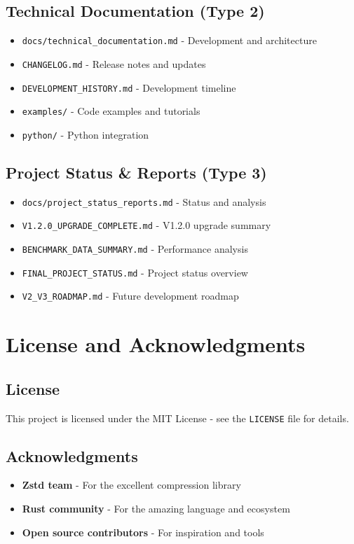 \documentclass[11pt,a4paper]{article}
\begin{document}
	\subsection{Technical Documentation (Type 2)}
	\begin{itemize}
		\item \texttt{docs/technical\_documentation.md} - Development and architecture
		\item \texttt{CHANGELOG.md} - Release notes and updates
		\item \texttt{DEVELOPMENT\_HISTORY.md} - Development timeline
		\item \texttt{examples/} - Code examples and tutorials
		\item \texttt{python/} - Python integration
	\end{itemize}

	\subsection{Project Status \& Reports (Type 3)}
	\begin{itemize}
		\item \texttt{docs/project\_status\_reports.md} - Status and analysis
		\item \texttt{V1.2.0\_UPGRADE\_COMPLETE.md} - V1.2.0 upgrade summary
		\item \texttt{BENCHMARK\_DATA\_SUMMARY.md} - Performance analysis
		\item \texttt{FINAL\_PROJECT\_STATUS.md} - Project status overview
		\item \texttt{V2\_V3\_ROADMAP.md} - Future development roadmap
	\end{itemize}

	\section{License and Acknowledgments}
	\label{sec:license}

	\subsection{License}
	This project is licensed under the MIT License - see the \texttt{LICENSE} file for details.

	\subsection{Acknowledgments}
	\begin{itemize}
		\item \textbf{Zstd team} - For the excellent compression library
		\item \textbf{Rust community} - For the amazing language and ecosystem
		\item \textbf{Open source contributors} - For inspiration and tools
	\end{itemize}
\end{document}
